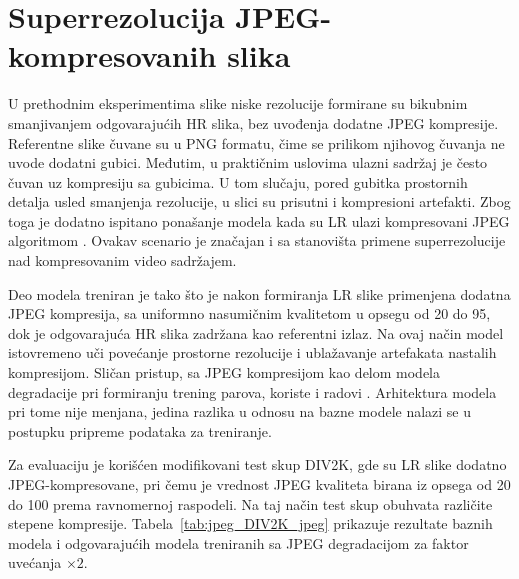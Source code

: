 \documentclass[12pt,a4paper]{article}
\begin{document}
\section{Superrezolucija JPEG-kompresovanih slika}
\label{sec:jpeg}

U prethodnim eksperimentima slike niske rezolucije formirane su bikubnim smanjivanjem odgovarajućih HR slika, bez uvođenja dodatne JPEG kompresije. Referentne slike čuvane su u PNG formatu, čime se prilikom njihovog čuvanja ne uvode dodatni gubici. Međutim, u praktičnim uslovima ulazni sadržaj je često čuvan uz kompresiju sa gubicima. U tom slučaju, pored gubitka prostornih detalja usled smanjenja rezolucije, u slici su prisutni i kompresioni artefakti. Zbog toga je dodatno ispitano ponašanje modela kada su LR ulazi kompresovani JPEG algoritmom \cite{JPEG}. Ovakav scenario je značajan i sa stanovišta primene superrezolucije nad kompresovanim video sadržajem.

Deo modela treniran je tako što je nakon formiranja LR slike primenjena dodatna JPEG kompresija, sa uniformno nasumičnim kvalitetom u opsegu od 20 do 95, dok je odgovarajuća HR slika zadržana kao referentni izlaz. Na ovaj način model istovremeno uči povećanje prostorne rezolucije i ublažavanje artefakata nastalih kompresijom. Sličan pristup, sa JPEG kompresijom kao delom modela degradacije pri formiranju trening parova, koriste i radovi \cite{BSRGAN, RealESRGAN}. Arhitektura modela pri tome nije menjana, jedina razlika u odnosu na bazne modele nalazi se u postupku pripreme podataka za treniranje.

Za evaluaciju je korišćen modifikovani test skup DIV2K, gde su LR slike dodatno JPEG-kompresovane, pri čemu je vrednost JPEG kvaliteta birana iz opsega od 20 do 100 prema ravnomernoj raspodeli. Na taj način test skup obuhvata različite stepene kompresije. Tabela~\ref{tab:jpeg_DIV2K_jpeg} prikazuje rezultate baznih modela i odgovarajućih modela treniranih sa JPEG degradacijom za faktor uvećanja $\times2$.
\end{document}

